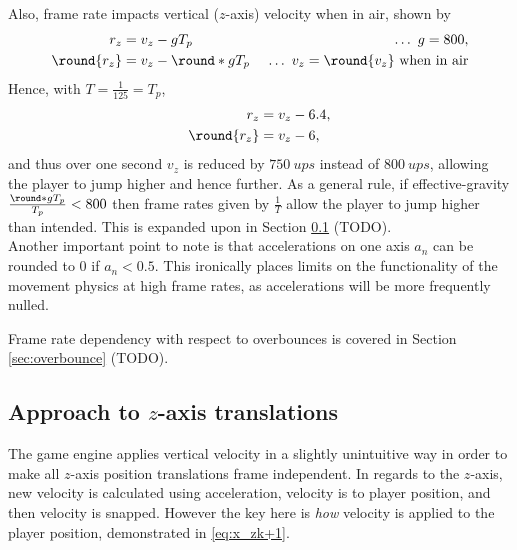 Also, frame rate impacts vertical ($z$-axis) velocity when in air, shown by
\begin{align*}
r_z &= v_z - gT_p\ &\ldots\ g = 800,\\
\round{r_z} &= v_z - \round*{gT_p}\ &\ldots\ v_z = \round{v_z}\ \text{when in air}
\end{align*}
Hence, with $T = \frac{1}{125} = T_p$,
\begin{align*}
r_z &= v_z - 6.4,\\
\round{r_z} &= v_z - 6,
\end{align*}
and thus over one second $v_z$ is reduced by $\qty{750}{ups}$ instead of $\qty{800}{ups}$, allowing the player to jump higher and hence further.
As a general rule, if effective-gravity $\frac{\round*{gT_p}}{T_p} < 800$ then frame rates given by $\frac{1}{T}$ allow the player to jump higher than intended.
This is expanded upon in Section \ref{sec:x_z} (TODO).\\

Another important point to note is that accelerations on one axis $a_n$ can be rounded to 0 if $a_n < 0.5$.
This ironically places limits on the functionality of the movement physics at high frame rates, as accelerations will be more frequently nulled.


Frame rate dependency with respect to overbounces is covered in Section \ref{sec:overbounce} (TODO).


\subsection{Approach to $z$-axis translations}
\label{sec:x_z}
The game engine applies vertical velocity in a slightly unintuitive way in order to make all $z$-axis position translations frame independent.
In regards to the $z$-axis, new velocity is calculated using acceleration, velocity is to player position, and then velocity is snapped.
However the key here is \emph{how} velocity is applied to the player position, demonstrated in \eqref{eq:x_zk+1}.

